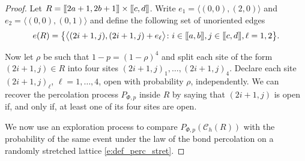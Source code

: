 \documentclass[a4paper,oneside,12pt]{amsart}
\def\llbracket{[\hspace{-.10em} [ }
\def\rrbracket{ ] \hspace{-.10em}]}
\theoremstyle{plain}
\theoremstyle{definition}
\theoremstyle{remark}
\begin{document}
\begin{proof}
Let $R = \llbracket 2a+1,2b+1 \rrbracket \times\llbracket c,d \rrbracket $.
Write $e_1 = \langle (0,0), (2,0)\rangle $ and $e_2 = \langle (0,0), (0,1) \rangle$ and define the following set of unoriented edges
\begin{equation*}
e(R) = \big\{ \big\langle (2i+1,j), (2i+1,j) + e_\ell \big\rangle \colon i \in \llbracket a, b\rrbracket, j \in \llbracket c,d \rrbracket, \ell = 1,2 \big\}.
\end{equation*}

Now let $\rho$ be such that $1-p = (1-\rho)^4$ and split each site of the form $(2i+1,j) \in R$  into four sites $(2i+1,j)_1, \dots, (2i+1,j)_4$.
Declare each site $(2i+1,j)_{\ell}$, $\ell = 1, \dots, 4$, open with probability $\rho$, independently.
We can recover the percolation process $P_{\Phi,p}$ inside $R$ by saying that $(2i+1,j)$ is open if, and only if, at least one of its four sites are open.

We now use an exploration process to compare $P_{\Phi,p}(\mathcal{C}_{h}(R))$ with the probability of the same event under the law of the bond percolation on a randomly stretched lattice \eqref{e:def_perc_stret}.


\end{proof}
\end{document}

